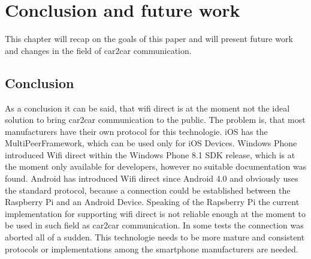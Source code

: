 \chapter{Conclusion and future work}
\label{cha:ConclusionFutureWork}
This chapter will recap on the goals of this paper and will present future work and changes in the field of car2car communication.

\section{Conclusion}
\label{sec:Conclusion}
As a conclusion it can be said, that wifi direct is at the moment not the ideal solution to bring car2car communication to the public. The problem is, that most manufacturers have their own protocol for this technologie. iOS has the MultiPeerFramework, which can be used only for iOS Devices. Windows Phone introduced Wifi direct within the Windows Phone 8.1 SDK release, which is at the moment only available for developers, however no suitable documentation was found. Android has introduced Wifi direct since Android 4.0 and obviously uses the standard protocol, because a connection could be established between the Raspberry Pi and an Android Device. Speaking of the Rapsberry Pi the current implementation for supporting wifi direct is not reliable enough at the moment to be used in such field as car2car communication. In some tests the connection was aborted all of a sudden. This technologie needs to be more mature and consistent protocols or implementations among the smartphone manufacturers are needed.

